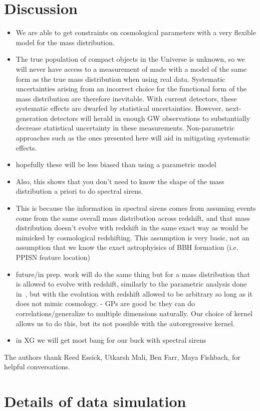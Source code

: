 \documentclass[]{aastex631}
\begin{document}

\section{Discussion}
\label{sec:discussion}


\begin{itemize}
    \item We are able to get constraints on cosmological parameters with a very flexible model for the mass distribution. 
    \item The true population of compact objects in the Universe is unknown, so we will never have access to a measurement of \Ho{} made with a model of the same form as the true mass distribution when using real data.
Systematic uncertainties arising from an incorrect choice for the functional form of the mass distribution are therefore inevitable.
With current detectors, these systematic effects are dwarfed by statistical uncertainties.
However, next-generation detectors will herald in enough GW observations to substantially decrease statistical uncertainty in these measurements.
Non-parametric approaches such as the ones presented here will aid in mitigating systematic effects.
    \item hopefully these will be less biased than using a parametric model
    \item Also, this shows that you don't need to know the shape of the mass distribution a priori to do spectral sirens.
    \item This is because the information in spectral sirens comes from assuming events come from the same overall mass distribution across redshift, and that mass distribution doesn't evolve with redshift in the same exact way as would be mimicked by cosmological redshifting. This assumption is very basic, not an assumption that we know the exact astrophyisics of BBH formation (i.e. PPISN feature location)
    \item future/in prep. work will do the same thing but for a mass distribution that is allowed to evolve with redshift, similarly to the parametric analysis done in~\cite{ezquiaga_spectral_2022}, but with the evolution with redshift allowed to be arbitrary so long as it does not mimic cosmology. - GPs are good bc they can do correlations/generalize to multiple dimensions naturally. Our choice of kernel allows us to do this, but its not possible with the autoregressive kernel.
    \item in XG we will get most bang for our buck with spectral sirens
\end{itemize}
\begin{acknowledgments}
    The authors thank Reed Essick, Utkarsh Mali, Ben Farr, Maya Fishbach,  for helpful conversations.
\end{acknowledgments}


\appendix
\section{Details of data simulation}
\end{document}
